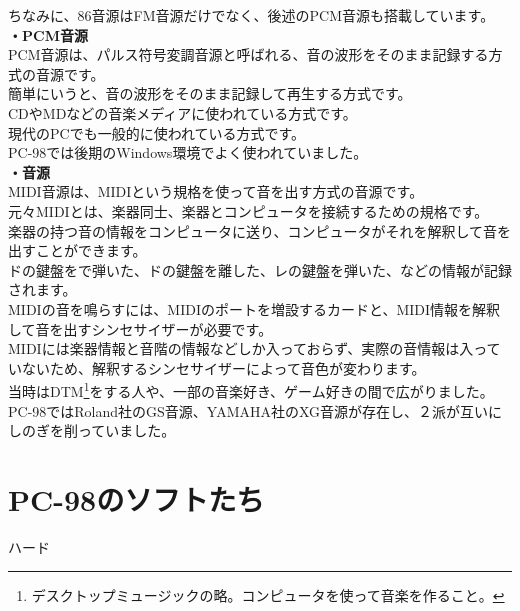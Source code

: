 \documentclass[b5paper,9pt,platex,dvipdfmx]{jsarticle}
\begin{document}
\begin{multicols*}{3}
\begin{enumerate}
  ちなみに、86音源はFM音源だけでなく、後述のPCM音源も搭載しています。\\
  {\bf ・PCM音源 \\}
  PCM音源は、パルス符号変調音源と呼ばれる、音の波形をそのまま記録する方式の音源です。\\
  簡単にいうと、音の波形をそのまま記録して再生する方式です。\\
  CDやMDなどの音楽メディアに使われている方式です。\\
  現代のPCでも一般的に使われている方式です。\\
  PC-98では後期のWindows環境でよく使われていました。\\
  {\bf ・音源 \\}
  MIDI音源は、MIDIという規格を使って音を出す方式の音源です。\\
  元々MIDIとは、楽器同士、楽器とコンピュータを接続するための規格です。\\
  楽器の持つ音の情報をコンピュータに送り、コンピュータがそれを解釈して音を出すことができます。\\
  ドの鍵盤をで弾いた、ドの鍵盤を離した、レの鍵盤を弾いた、などの情報が記録されます。\\
  MIDIの音を鳴らすには、MIDIのポートを増設するカードと、MIDI情報を解釈して音を出すシンセサイザーが必要です。\\
  MIDIには楽器情報と音階の情報などしか入っておらず、実際の音情報は入っていないため、解釈するシンセサイザーによって音色が変わります。\\
  当時はDTM\footnote{デスクトップミュージックの略。コンピュータを使って音楽を作ること。}をする人や、一部の音楽好き、ゲーム好きの間で広がりました。\\
  PC-98ではRoland社のGS音源、YAMAHA社のXG音源が存在し、２派が互いにしのぎを削っていました。\\
\end{enumerate}
\part{PC-98のソフトたち}
\setcounter{section}{0}
ハード
\end{multicols*}
\end{document}

